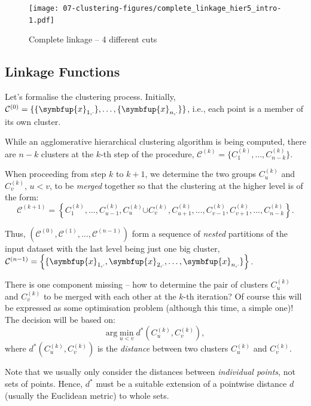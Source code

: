 \documentclass[10pt,b5paper,krantz1]{krantz}
\renewcommand{\mathbf}[1]{\symbfup{#1}}
\begin{document}
\begin{figure}
\hypertarget{fig:complete_linkage_hier5_intro}{%
\centering
\texttt{[image: 07-clustering-figures/complete\_linkage\_hier5\_intro-1.pdf]}
\caption{Complete linkage -- 4 different cuts}\label{fig:complete_linkage_hier5_intro}
}
\end{figure}

\hypertarget{linkage-functions}{%
\subsection{Linkage Functions}\label{linkage-functions}}

Let's formalise the clustering process.
Initially, \(\mathcal{C}^{(0)}=\{\{\mathbf{x}_{1,\cdot}\},\dots,\{\mathbf{x}_{n,\cdot}\}\}\),
i.e., each point is a member of its own cluster.

While an agglomerative hierarchical clustering algorithm is being computed,
there are \(n-k\) clusters at the \(k\)-th step of the procedure,
\(\mathcal{C}^{(k)}=\{C_1^{(k)},\dots,C_{n-k}^{(k)}\}\).

When proceeding from step \(k\) to \(k+1\),
we determine the two groups \(C_u^{(k)}\) and \(C_v^{(k)}\), \(u<v\),
to be \emph{merged} together so that the clustering at the higher level
is of the form:
\[
\mathcal{C}^{(k+1)} = \left\{
C_1^{(k)},\dots,C_{u-1}^{(k)},
C_u^{(k)}{\cup C_v^{(k)}},
C_{u+1}^{(k)},\dots,C_{v-1}^{(k)},
C_{v+1}^{(k)},\dots,C_{n-k}^{(k)}
\right\}.
\]

Thus, \((\mathcal{C}^{(0)}, \mathcal{C}^{(1)}, \dots, \mathcal{C}^{(n-1)})\)
form a sequence of \emph{nested} partitions of
the input dataset
with the last level being just one big cluster,
\(\mathcal{C}^{(n-1)}=\left\{ \{\mathbf{x}_{1,\cdot},\mathbf{x}_{2,\cdot},\dots,\mathbf{x}_{n,\cdot}\} \right\}\).

\bigskip

There is one component missing -- how to determine the pair
of clusters \(C_u^{(k)}\) and \(C_v^{(k)}\) to be merged with each other
at the \(k\)-th iteration?
Of course this will be expressed as some optimisation problem (although this time,
a simple one)! The decision will be based on:
\[
\mathrm{arg}\min_{u < v} d^*(C_u^{(k)}, C_v^{(k)}),
\]
where \(d^*(C_u^{(k)}, C_v^{(k)})\) is the \emph{distance} between two clusters
\(C_u^{(k)}\) and \(C_v^{(k)}\).

Note that we usually only consider the distances between \emph{individual points},
not sets of points. Hence, \(d^*\) must be a suitable extension
of a pointwise distance \(d\) (usually the Euclidean metric)
to whole sets.
\end{document}
